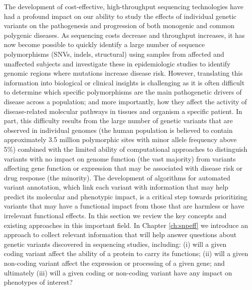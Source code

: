 The development of cost-effective, high-throughput sequencing technologies have had a profound impact on our ability to study the effects of individual genetic variants on the pathogenesis and progression of both monogenic and common polygenic diseases. 
As sequencing costs decrease and throughput increases, it has now become possible to quickly identify a large number of sequence polymorphisms (SNVs, indels, structural) using samples from affected and unaffected subjects and investigate these in epidemiologic studies to identify genomic regions where mutations increase disease risk. 
However, translating this information into biological or clinical insights is challenging as it is often difficult to determine which specific polymorphisms are the main pathogenetic drivers of disease across a population; and more importantly, how they affect the activity of disease-related molecular pathways in tissues and organism a specific patient. 
In part, this difficulty results from the large number of genetic variants that are observed in individual genomes (the human population is believed to contain approximately 3.5 million polymorphic sites with minor allele frequency above 5\%) combined with the limited ability of computational approaches to distinguish variants with no impact on genome function (the vast majority) from variants affecting gene function or expression that may be associated with disease risk or drug response (the minority). 
The development of algorithms for automated variant annotation, which link each variant with information that may help predict its molecular and phenotypic impact, is a critical step towards prioritizing variants that may have a functional impact from those that are harmless or have irrelevant functional effects. 
In this section we review the key concepts and existing approaches in this important field. 
In Chapter \ref{ch:snpeff} we introduce an approach to collect relevant information that will help answer questions about genetic variants discovered in sequencing studies, including: (i) will a given coding variant affect the ability of a protein to carry its functions; (ii) will a given non-coding variant affect the expression or processing of a given gene; and ultimately (iii) will a given coding or non-coding variant have any impact on phenotypes of interest?

